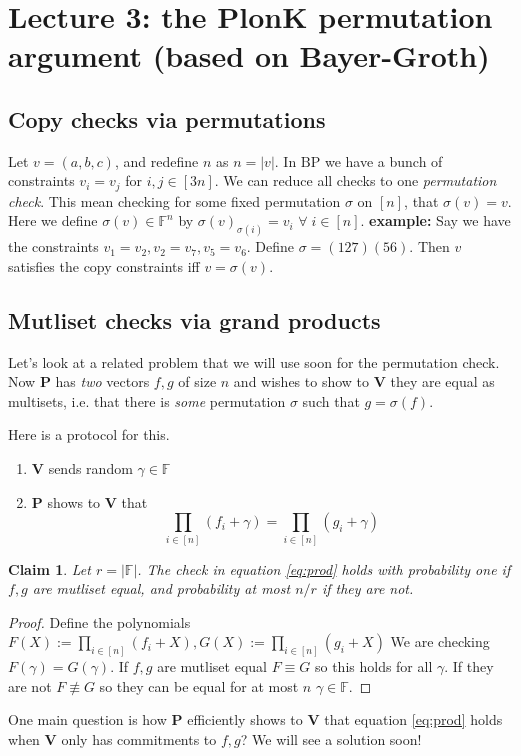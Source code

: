\documentclass[11pt]{article} %
\newcommand{\F}{\ensuremath{\mathbb F}\xspace}
\newcommand{\defeq}{:=}
\newcommand{\prv}{\ensuremath{\mathsf{\mathbf{P}}}\xspace}
\newcommand{\ver}{\ensuremath{\mathsf{\mathbf{V}}}\xspace}
\newtheorem{claim}[lemma]{Claim}
\newcommand{\prog}{\ensuremath{\mathrm{BP}}\xspace}
\begin{document}
\section{Lecture 3: the PlonK permutation argument (based on Bayer-Groth)}
\subsection{Copy checks via permutations}
Let $v=(a,b,c)$, and redefine $n$ as $n=|v|$. In \prog we have a bunch of constraints $v_i=v_j$ for $i,j \in [3n]$.
We can reduce all checks to one \emph{permutation check}.
This mean checking for some fixed permutation $\sigma$ on $[n]$, that $\sigma(v)=v$.
Here we define $\sigma(v)\in \F^n$ by $\sigma(v)_{\sigma(i)} =v_i$ $\forall\; i\in [n]$.
\textbf{example:}
Say we have the constraints $v_1=v_2, v_2=v_7, v_5=v_6$.
Define $\sigma= (127)(56)$.
Then $v$ satisfies the copy constraints iff $v=\sigma(v)$.


\subsection{Mutliset checks via grand products}
Let's look at a related problem that we will use soon for the permutation check.
Now \prv has  \emph{two} vectors $f,g$ of size $n$ and wishes to show to \ver they are equal as multisets,
i.e. that there is \emph{some} permutation $\sigma$ such that $g=\sigma(f)$.

Here is a protocol for this.
\begin{enumerate}
 \item \ver sends random $\gamma\in \F$
 \item \prv shows to \ver  that 
 \[\prod_{i\in [n]} (f_i+\gamma) = \prod_{i\in [n]}(g_i+\gamma)\]\label{eq:prod}
\end{enumerate}
\begin{claim}
Let $r=|\F|$.
 The check in equation \ref{eq:prod} holds with probability one if $f,g$ are mutliset equal,
 and probability at most $n/r$ if they are not.
\end{claim}
\begin{proof}
Define the polynomials 
$F(X)\defeq \prod_{i\in [n]} (f_i+X),G(X)\defeq \prod_{i\in [n]} (g_i+X)$
We are checking $F(\gamma)=G(\gamma)$. If $f,g$ are mutliset equal $F\equiv G$ so this holds for all $\gamma$.
If they are not $F\not\equiv G$ so they can be equal for at most $n$ $\gamma\in \F$.
\end{proof}


One main question is how \prv efficiently shows to \ver that equation \ref{eq:prod} holds when \ver only 
has commitments to $f,g$? We will see a solution soon!
\end{document}
